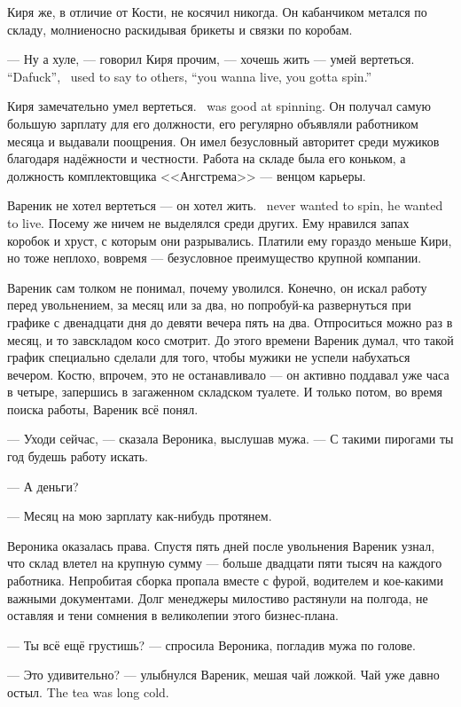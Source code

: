 Киря же, в отличие от Кости, не косячил никогда.
Он кабанчиком метался по складу, молниеносно раскидывая брикеты и связки по коробам.

{--- Ну а хуле, --- говорил Киря прочим, --- хочешь жить --- умей вертеться.}
{``Dafuck'', \Kirya\ used to say to others, ``you wanna live, you gotta spin.''}

{Киря замечательно умел вертеться.}
{\Kirya\ was good at spinning.}
Он получал самую большую зарплату для его должности, его регулярно объявляли работником месяца и выдавали поощрения.
Он имел безусловный авторитет среди мужиков благодаря надёжности и честности.
Работа на складе была его коньком, а должность комплектовщика <<Ангстрема>> --- венцом карьеры.

{Вареник не хотел вертеться --- он хотел жить.}
{\Varenik\ never wanted to spin, he wanted to live.}
Посему же ничем не выделялся среди других.
Ему нравился запах коробок и хруст, с которым они разрывались.
Платили ему гораздо меньше Кири, но тоже неплохо, вовремя --- безусловное преимущество крупной компании.

Вареник сам толком не понимал, почему уволился.
Конечно, он искал работу перед увольнением, за месяц или за два, но попробуй-ка развернуться при графике с двенадцати дня до девяти вечера пять на два.
Отпроситься можно раз в месяц, и то завскладом косо смотрит.
До этого времени Вареник думал, что такой график специально сделали для того, чтобы мужики не успели набухаться вечером.
Костю, впрочем, это не останавливало --- он активно поддавал уже часа в четыре, запершись в загаженном складском туалете.
И только потом, во время поиска работы, Вареник всё понял.

--- Уходи сейчас, --- сказала Вероника, выслушав мужа.
--- С такими пирогами ты год будешь работу искать.

--- А деньги?

--- Месяц на мою зарплату как-нибудь протянем.

Вероника оказалась права.
Спустя пять дней после увольнения Вареник узнал, что склад влетел на крупную сумму --- больше двадцати пяти тысяч на каждого работника.
Непробитая сборка пропала вместе с фурой, водителем и кое-какими важными документами.
Долг менеджеры милостиво растянули на полгода, не оставляя и тени сомнения в великолепии этого бизнес-плана.

--- Ты всё ещё грустишь? --- спросила Вероника, погладив мужа по голове.

--- Это удивительно? --- улыбнулся Вареник, мешая чай ложкой.
{Чай уже давно остыл.}
{The tea was long cold.}

